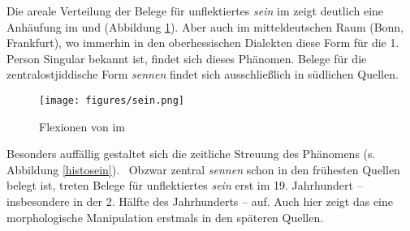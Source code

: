  
Die areale Verteilung der Belege für unflektiertes \textit{sein} im  zeigt deutlich eine Anhäufung im  und  (Abbildung \ref{kartesein}). Aber auch im mitteldeutschen Raum (Bonn, Frankfurt), wo immerhin in den oberhessischen Dialekten diese Form für die 1. Person Singular bekannt ist, findet sich dieses Phänomen. Belege für die zentralostjiddische Form \textit{sennen} findet sich ausschließlich in südlichen Quellen.

\begin{figure} 

\texttt{[image: figures/sein.png]}
		\caption{\label{kartesein} Flexionen  von  im }
		\end{figure}
  


Besonders auffällig gestaltet sich die zeitliche Streuung des Phänomens (s. Abbildung \ref{histosein}). \,%
Obzwar zentral \textit{sennen} schon in den frühesten Quellen belegt ist, treten Belege für unflektiertes \textit{sein} erst im 19. Jahrhundert – insbesondere in der 2. Hälfte des Jahrhunderts – auf. Auch hier zeigt das \hai{{\LiJieins}} eine morphologische Manipulation erstmals in den späteren Quellen.

